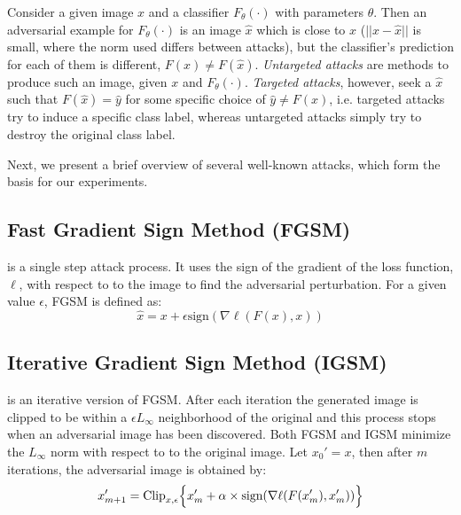Consider a given image $x$ and a classifier $F_\theta(\cdot)$ with parameters $\theta$.
Then an adversarial example for $F_\theta(\cdot)$ is an image $\hat{x}$ which is close
to $x$ (\ie $||x-\hat{x}||$ is small, where the norm used differs between attacks),  but the classifier's prediction for each of them is different, \ie $F(x) \neq F(\hat{x})$. 
\textit{Untargeted attacks} are  methods to produce such an image, given $x$ and $F_\theta(\cdot)$. 
\emph{Targeted attacks}, however, seek a $\hat{x}$ such that $F(\hat{x}) = \hat{y}$ for some specific choice of $\hat{y} \neq F(x)$, i.e. targeted attacks try to induce a specific class label, whereas untargeted attacks simply try to destroy the original class label.

Next, we present a brief overview of several well-known attacks, which form the basis for our experiments.

\subsection{Fast Gradient Sign Method (FGSM)}
\cite{Goodfellow2014ExplainingAH} is a single step attack process.
It uses the sign of the gradient of the loss function,  $\ell$,  with respect to to the image to find the adversarial perturbation. 
For a given value $\epsilon$, FGSM is defined as:
\begin{equation}
\hat{x} = x + \epsilon \text{sign} (\nabla \ell (F(x),x))
\end{equation}

\subsection{Iterative Gradient Sign Method (IGSM)} 
\cite{Kurakin2016AdversarialEI} is an iterative version of FGSM. After each iteration the generated image is clipped to be within a $\epsilon L_\infty$ neighborhood of the original and this process stops when an adversarial image has been discovered. 
Both FGSM and IGSM minimize the $L_\infty$ norm with respect to to the original image. Let $x_0' = x$, then after $m$ iterations, the adversarial image is obtained by:
\begin{equation}
x_{m+1}' = \text{Clip}_{x,\epsilon} \Bigl\{x_m' + \alpha \times \text{sign}(\nabla \ell (F(x'_m),x'_m))  \Bigr\} 
\end{equation}

